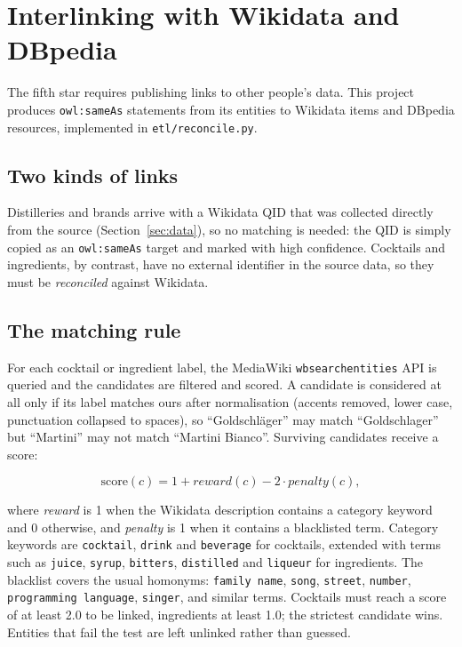 \section{Interlinking with Wikidata and DBpedia}
\label{sec:interlinking}

The fifth star requires publishing links to other people's data. This project
produces \texttt{owl:sameAs} statements from its entities to Wikidata items and
DBpedia resources, implemented in \texttt{etl/reconcile.py}.

\subsection{Two kinds of links}

Distilleries and brands arrive with a Wikidata QID that was collected directly
from the source (Section~\ref{sec:data}), so no matching is needed: the QID is simply copied
as an \texttt{owl:sameAs} target and marked with high confidence. Cocktails and
ingredients, by contrast, have no external identifier in the source data, so
they must be \emph{reconciled} against Wikidata.

\subsection{The matching rule}

For each cocktail or ingredient label, the MediaWiki
\texttt{wbsearchentities} API is queried and the candidates are filtered and
scored. A candidate is considered at all only if its label matches ours after
normalisation (accents removed, lower case, punctuation collapsed to spaces),
so ``Goldschl\"ager'' may match ``Goldschlager'' but ``Martini'' may not match
``Martini Bianco''. Surviving candidates receive a score:

\[
\mathrm{score}(c) = 1 + \mathit{reward}(c) - 2 \cdot \mathit{penalty}(c),
\]

where \emph{reward} is 1 when the Wikidata description contains a
category keyword and 0 otherwise, and \emph{penalty} is 1 when it contains a
blacklisted term. Category keywords are \texttt{cocktail}, \texttt{drink} and
\texttt{beverage} for cocktails, extended with terms such as \texttt{juice},
\texttt{syrup}, \texttt{bitters}, \texttt{distilled} and \texttt{liqueur} for
ingredients. The blacklist covers the usual homonyms: \texttt{family name},
\texttt{song}, \texttt{street}, \texttt{number}, \texttt{programming language},
\texttt{singer}, and similar terms. Cocktails must reach a score of at least
2.0 to be linked, ingredients at least 1.0; the strictest candidate wins.
Entities that fail the test are left unlinked rather than guessed.

